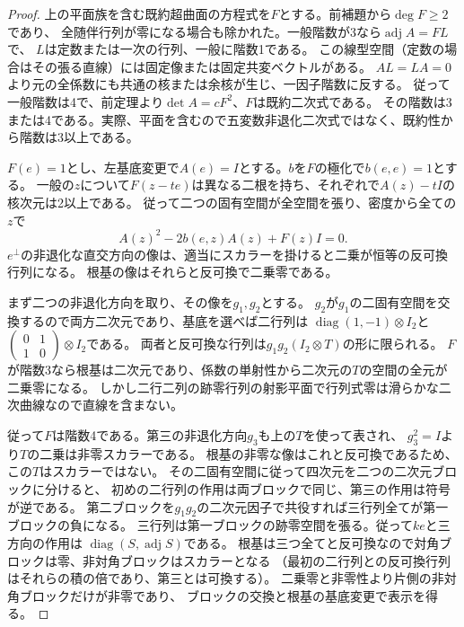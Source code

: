 \begin{proof}
上の平面族を含む既約超曲面の方程式を$F$とする。前補題から$\deg F\ge2$であり、
全随伴行列が零になる場合も除かれた。一般階数が3なら$\operatorname{adj}A=F L$で、
$L$は定数または一次の行列、一般に階数1である。
この線型空間（定数の場合はその張る直線）には固定像または固定共変ベクトルがある。
$AL=LA=0$より元の全係数にも共通の核または余核が生じ、一因子階数に反する。
従って一般階数は4で、前定理より$\det A=c F^2$、$F$は既約二次式である。
その階数は3または4である。実際、平面を含むので五変数非退化二次式ではなく、既約性から階数は3以上である。

$F(e)=1$とし、左基底変更で$A(e)=I$とする。$b$を$F$の極化で$b(e,e)=1$とする。
一般の$z$について$F(z-te)$は異なる二根を持ち、それぞれで$A(z)-tI$の核次元は2以上である。
従って二つの固有空間が全空間を張り、密度から全ての$z$で
\[
 A(z)^2-2b(e,z)A(z)+F(z)I=0 .
\]
$e^\perp$の非退化な直交方向の像は、適当にスカラーを掛けると二乗が恒等の反可換行列になる。
根基の像はそれらと反可換で二乗零である。

まず二つの非退化方向を取り、その像を$g_1,g_2$とする。
$g_2$が$g_1$の二固有空間を交換するので両方二次元であり、基底を選べば二行列は
$\operatorname{diag}(1,-1)\otimes I_2$と
$\left(\begin{smallmatrix}0&1\\1&0\end{smallmatrix}\right)\otimes I_2$である。
両者と反可換な行列は$g_1g_2(I_2\otimes T)$の形に限られる。
$F$が階数3なら根基は二次元であり、係数の単射性から二次元の$T$の空間の全元が二乗零になる。
しかし二行二列の跡零行列の射影平面で行列式零は滑らかな二次曲線なので直線を含まない。

従って$F$は階数4である。第三の非退化方向$g_3$も上の$T$を使って表され、
$g_3^2=I$より$T$の二乗は非零スカラーである。
根基の非零な像はこれと反可換であるため、この$T$はスカラーではない。
その二固有空間に従って四次元を二つの二次元ブロックに分けると、
初めの二行列の作用は両ブロックで同じ、第三の作用は符号が逆である。
第二ブロックを$g_1g_2$の二次元因子で共役すれば三行列全てが第一ブロックの負になる。
三行列は第一ブロックの跡零空間を張る。従って$ke$と三方向の作用は
$\operatorname{diag}(S,\operatorname{adj}S)$である。
根基は三つ全てと反可換なので対角ブロックは零、非対角ブロックはスカラーとなる
（最初の二行列との反可換行列はそれらの積の倍であり、第三とは可換する）。
二乗零と非零性より片側の非対角ブロックだけが非零であり、
ブロックの交換と根基の基底変更で表示を得る。
\end{proof}

